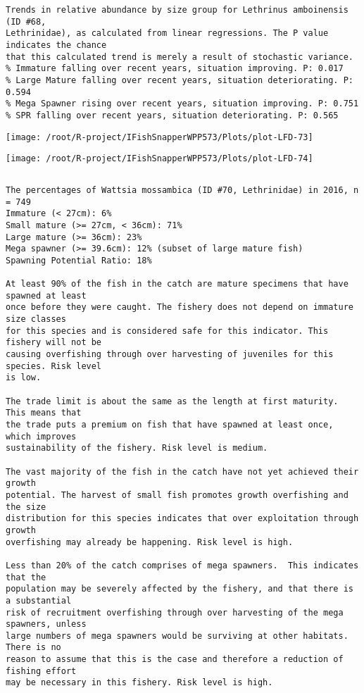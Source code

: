 \documentclass{report}\usepackage[]{graphicx}\usepackage[]{color}
\makeatletter
\def\maxwidth{ %
  \ifdim\Gin@nat@width>\linewidth
    \linewidth
  \else
    \Gin@nat@width
  \fi
}
\newenvironment{kframe}{%
 \def\at@end@of@kframe{}%
 \ifinner\ifhmode%
  \def\at@end@of@kframe{\end{minipage}}%
  \begin{minipage}{\columnwidth}%
 \fi\fi%
 \def\FrameCommand##1{\hskip\@totalleftmargin \hskip-\fboxsep
 \colorbox{shadecolor}{##1}\hskip-\fboxsep
     \hskip-\linewidth \hskip-\@totalleftmargin \hskip\columnwidth}%
 \MakeFramed {\advance\hsize-\width
   \@totalleftmargin\z@ \linewidth\hsize
   \@setminipage}}%
 {\par\unskip\endMakeFramed%
 \at@end@of@kframe}
\newenvironment{knitrout}{}{} %
\makeatother
\begin{document}
\begin{knitrout}
\begin{kframe}
\begin{verbatim}
Trends in relative abundance by size group for Lethrinus amboinensis (ID #68,
Lethrinidae), as calculated from linear regressions. The P value indicates the chance
that this calculated trend is merely a result of stochastic variance.
% Immature falling over recent years, situation improving. P: 0.017
% Large Mature falling over recent years, situation deteriorating. P: 0.594
% Mega Spawner rising over recent years, situation improving. P: 0.751
% SPR falling over recent years, situation deteriorating. P: 0.565
\end{verbatim}
\end{kframe}
\texttt{[image: /root/R-project/IFishSnapperWPP573/Plots/plot-LFD-73]} 

\texttt{[image: /root/R-project/IFishSnapperWPP573/Plots/plot-LFD-74]} 
\begin{kframe}\begin{verbatim}
\end{verbatim}
\end{kframe}
\clearpage
\newpage
\begin{kframe}\begin{verbatim}The percentages of Wattsia mossambica (ID #70, Lethrinidae) in 2016, n = 749
Immature (< 27cm): 6%
Small mature (>= 27cm, < 36cm): 71%
Large mature (>= 36cm): 23%
Mega spawner (>= 39.6cm): 12% (subset of large mature fish)
Spawning Potential Ratio: 18%
 
At least 90% of the fish in the catch are mature specimens that have spawned at least
once before they were caught. The fishery does not depend on immature size classes
for this species and is considered safe for this indicator. This fishery will not be
causing overfishing through over harvesting of juveniles for this species. Risk level
is low.

The trade limit is about the same as the length at first maturity.  This means that
the trade puts a premium on fish that have spawned at least once, which improves
sustainability of the fishery. Risk level is medium.

The vast majority of the fish in the catch have not yet achieved their growth
potential. The harvest of small fish promotes growth overfishing and the size
distribution for this species indicates that over exploitation through growth
overfishing may already be happening. Risk level is high.

Less than 20% of the catch comprises of mega spawners.  This indicates that the
population may be severely affected by the fishery, and that there is a substantial
risk of recruitment overfishing through over harvesting of the mega spawners, unless
large numbers of mega spawners would be surviving at other habitats. There is no
reason to assume that this is the case and therefore a reduction of fishing effort
may be necessary in this fishery. Risk level is high.
 

\end{verbatim}
\end{kframe}
\end{knitrout}
\end{document}
